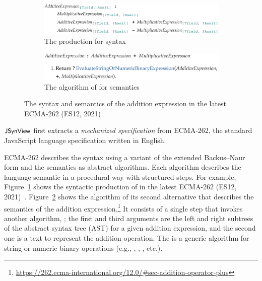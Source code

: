 \begin{figure}
  \centering
  \begin{subfigure}[t]{\columnwidth}
    \centering
    \includegraphics[width=\columnwidth]{img/add-eval-bnf.png}
    \caption{The  production for syntax}
    \label{fig:add-eval-bnf}
  \end{subfigure}
  \begin{subfigure}[t]{\columnwidth}
    \centering
    \includegraphics[width=\columnwidth]{img/add-eval-algo.png}
    \caption{The  algorithm of for semantics}
    \label{fig:add-eval-algo}
  \end{subfigure}
  \caption{The syntax and semantics of the addition expression in the latest
  ECMA-262 (ES12, 2021)}
  \vspace*{-1em}
  \label{fig:add-eval}
\end{figure}

$\textsf{\small JSynView}$ first extracts a \textit{mechanized specification} from ECMA-262, the
standard JavaScript language specification written in English.

ECMA-262 describes the syntax using a variant of the extended Backus–Naur form
and the semantics as abstract algorithms.  Each algorithm describes the language
semantic in a procedural way with structured steps.  For example,
Figure~\ref{fig:add-eval-bnf} shows the syntactic production of
 in the latest ECMA-262 (ES12, 2021)~\cite{es12}.
Figure~\ref{fig:add-eval-algo} shows the  algorithm of its
second alternative that describes the semantics of the addition
expression.\footnote{\url{https://262.ecma-international.org/12.0/\#sec-addition-operator-plus}}
It consists of a single step that invokes another algorithm,
; the first and third arguments
are the left and right subtrees of the abstract syntax tree (AST) for a given
addition expression, and the second one is a text \code{+} to represent the
addition operation.  The  is a
generic algorithm for string or numeric binary operations (e.g., \code{-},
\code{*}, \code{<}, etc.).

